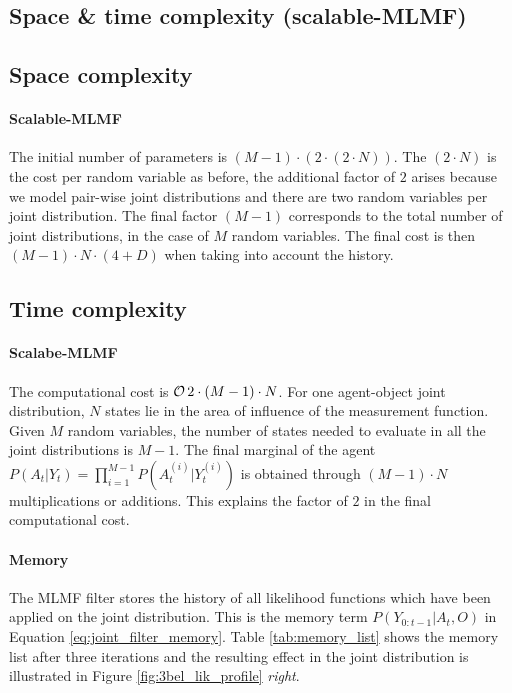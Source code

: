 \subsection{Space \& time complexity (scalable-MLMF)}\label{appendix:space_time_scalable_mlmf}


\subsection{Space complexity}

\paragraph{Scalable-MLMF}
The initial number of parameters is $\left(M - 1\right) \cdot \left(2 \cdot (2 \cdot N)\right)$. The $(2 \cdot N)$ is the cost per random variable
as before, the additional factor of $2$ arises because we model pair-wise joint distributions and there are two random variables per joint distribution. The final
factor $\left(M - 1\right)$ corresponds to the total number of joint distributions, in the case of $M$ random variables. The final cost is then 
$(M - 1) \cdot N \cdot \left(4 + D\right)$ when taking into account the history.

\subsection{Time complexity}

\paragraph{Scalabe-MLMF} The computational cost is $\operatorname{\mathcal{O}}{2 \cdot \left(M - 1\right) \cdot N }$. For one agent-object joint distribution, $N$
states lie in the area of influence of the measurement function. Given $M$ random variables, the number of states needed to evaluate in all the joint distributions
is $M-1$. The final marginal of the agent $P(A_t|Y_t) = \prod\limits_{i=1}^{M-1} P(A^{(i)}_t|Y^{(i)}_t)$ is obtained through $(M-1)\cdot N$ multiplications or additions.
This explains the factor of $2$ in the final computational cost.

\paragraph{Memory}\label{appendix:memory_time_complexity}

The MLMF filter stores the history of all likelihood functions which have been applied on the joint distribution. This is the 
memory term $P(Y_{0:t-1}|A_t,O)$ in Equation \ref{eq:joint_filter_memory}. Table \ref{tab:memory_list} shows the memory list after three 
iterations and the resulting effect in  the joint distribution is illustrated in Figure \ref{fig:3bel_lik_profile} \textit{right}.


